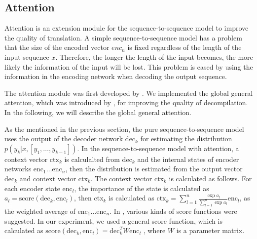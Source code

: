\documentclass[senior,final,11pt]{iscs-thesis}
\begin{document}
\subsection{Attention}
Attention is an extension module for the sequence-to-sequence model to improve the quality of translation. 
A simple sequence-to-sequence model has a problem that the size of the encoded vector $enc_{n}$ is fixed 
regardless of the length of the input sequence $x$. 
Therefore, the longer the length of the input becomes, the more likely the information of the input will be lost.
This problem is eased by using the information in the encoding network when decoding the output sequence.

The attention module was first developed by \citet{attention_paper}.
We implemented the global general attention, which was introduced by \citet{dot_attention}, for improving the quality of decompilation.
In the following, we will describe the global general attention.

As the mentioned in the previous section, the pure sequence-to-sequence model uses the output of the decoder network $ \mathrm{dec}_{k} $ for estimating 
the distribution $ p(y_k|x,[y_1,\dots,y_{k-1}]) $.
In the sequence-to-sequence model with attention, 
a context vector $ \mathrm{ctx}_{k} $ is calculalted from $ \mathrm{dec}_{k} $ and the internal states of encoder networks $ \mathrm{enc}_{1} \dots \mathrm{enc}_{n} $, 
then the distribution is estimated from the output vector $ \mathrm{dec}_{k} $ and context vector $ \mathrm{ctx}_{k} $.
The context vector $ \mathrm{ctx}_{k} $ is calculated as follows.
For each encoder state $ \mathrm{enc}_{l} $, the importance of the state is calculated as $ a_{l} = \mathrm{score}(\mathrm{dec}_{k},\mathrm{enc}_{l}) $,
then $ \mathrm{ctx}_{k} $ is calculated as $ \mathrm{ctx}_{k} = \sum_{l=1}^{n} \frac{\exp{a_{l}}}{\sum_{l=1}^{n}\exp{a_{l}}} \mathrm{enc}_{l} $, 
as the weighted average of $ \mathrm{enc}_{1} \dots \mathrm{enc}_{n} $.
In \citet{dot_attention}, various kinds of score functions were suggested.
In our experiment, we used a general score function, which is calculated as $ \mathrm{score}(\mathrm{dec}_{k},\mathrm{enc}_{l}) = \mathrm{dec}_{k}^T W \mathrm{enc}_{l} $ ,
where $ W $ is a parameter matrix.


\end{document}
